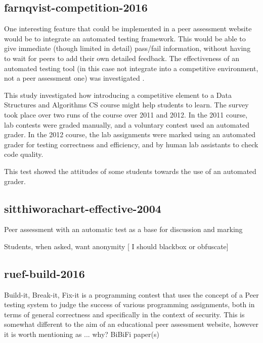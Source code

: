 \documentclass[a4paper,11pt]{report}
\begin{document}
\subsection{farnqvist-competition-2016}
One interesting feature that could be implemented in a peer assessment website would be to integrate an automated testing framework. This would be able to give immediate (though limited in detail) pass/fail information, without having to wait for peers to add their own detailed feedback. The effectiveness of an automated testing tool (in this case not integrate into a competitive environment, not a peer assessment one) was investigated \cite{farnqvist_competition_2016}.\par
This study investigated how introducing a competitive element to a Data Structures and Algorithms CS course might help students to learn. The survey took place over two runs of the course over 2011 and 2012. In the 2011 course, lab contests were graded manually, and a voluntary contest used an automated grader. In the 2012 course, the lab assignments were marked using an automated grader for testing correctness and efficiency, and by human lab assistants to check code quality.\par
This test showed the attitudes of some students towards the use of an automated grader.

\subsection{sitthiworachart-effective-2004}
Peer assessment with an automatic test as a base for discussion and marking\cite{sitthiworachart_effective_2004}\par
Students, when asked, want anonymity [ I should blackbox or obfuscate]\par

\subsection{ruef-build-2016}
Build-it, Break-it, Fix-it\cite{ruef_build_2016}\cite{ruef_build_2015} is a programming contest that uses the concept of a Peer testing system to judge the success of various programming assignments, both in terms of general correctness and specifically in the context of security. This is somewhat different to the aim of an educational peer assessment website, however it is worth mentioning as ... why?
BiBiFi paper(s)\par
\end{document}
